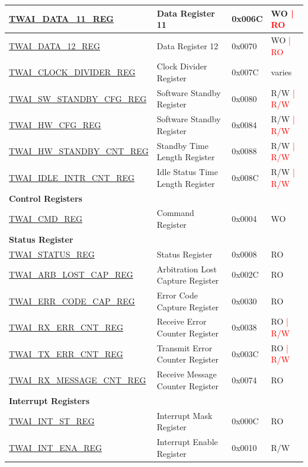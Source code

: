 \begin{longtable}{ | p{6cm} | p{6cm} | p{1.3cm} | p{2cm} | }
\hyperref[regdesc:TWAIDATA11REG]{TWAI\_DATA\_11\_REG} & Data Register 11 & 0x006C & WO \textcolor{red}{| RO} \\ \hline
\hyperref[regdesc:TWAIDATA12REG]{TWAI\_DATA\_12\_REG} & Data Register 12 & 0x0070 & WO \textcolor{red}{| RO} \\ \hline
\hyperref[regdesc:TWAICLOCKDIVIDERREG]{TWAI\_CLOCK\_DIVIDER\_REG} & Clock Divider Register & 0x007C & varies \\ \hline
\hyperref[regdesc:TWAISWSTANDBYCFGREG]{TWAI\_SW\_STANDBY\_CFG\_REG} & Software Standby Register & 0x0080 & R/W \textcolor{red}{| R/W} \\ \hline
\hyperref[regdesc:TWAIHWCFGREG]{TWAI\_HW\_CFG\_REG} & Software Standby Register & 0x0084 & R/W \textcolor{red}{| R/W} \\ \hline
\hyperref[regdesc:TWAIHWSTANDBYCNTREG]{TWAI\_HW\_STANDBY\_CNT\_REG} & Standby Time Length Register & 0x0088 & R/W \textcolor{red}{| R/W} \\ \hline
\hyperref[regdesc:TWAIIDLEINTRCNTREG]{TWAI\_IDLE\_INTR\_CNT\_REG} & Idle Status Time Length Register & 0x008C & R/W \textcolor{red}{| R/W} \\ \hline
\multicolumn{4}{|l|}{\textbf{Control Registers}} \\ \hline
\hyperref[regdesc:TWAICMDREG]{TWAI\_CMD\_REG} & Command Register & 0x0004 & WO \\ \hline
\multicolumn{4}{|l|}{\textbf{Status Register}} \\ \hline
\hyperref[regdesc:TWAISTATUSREG]{TWAI\_STATUS\_REG} & Status Register & 0x0008 & RO \\ \hline
\hyperref[regdesc:TWAIARBLOSTCAPREG]{TWAI\_ARB\_LOST\_CAP\_REG} & Arbitration Lost Capture Register & 0x002C & RO \\ \hline
\hyperref[regdesc:TWAIERRCODECAPREG]{TWAI\_ERR\_CODE\_CAP\_REG} & Error Code Capture Register & 0x0030 & RO \\ \hline
\hyperref[regdesc:TWAIRXERRCNTREG]{TWAI\_RX\_ERR\_CNT\_REG} & Receive Error Counter Register & 0x0038 & RO \textcolor{red}{| R/W} \\ \hline
\hyperref[regdesc:TWAITXERRCNTREG]{TWAI\_TX\_ERR\_CNT\_REG} & Transmit Error Counter Register & 0x003C & RO \textcolor{red}{| R/W} \\ \hline
\hyperref[regdesc:TWAIRXMESSAGECNTREG]{TWAI\_RX\_MESSAGE\_CNT\_REG} & Receive Message Counter Register & 0x0074 & RO \\ \hline
\multicolumn{4}{|l|}{\textbf{Interrupt Registers}} \\ \hline
\hyperref[regdesc:TWAIINTSTREG]{TWAI\_INT\_ST\_REG} & Interrupt Mask Register & 0x000C & RO \\ \hline
\hyperref[regdesc:TWAIINTENAREG]{TWAI\_INT\_ENA\_REG} & Interrupt Enable Register & 0x0010 & R/W \\ \hline
\end{longtable}
